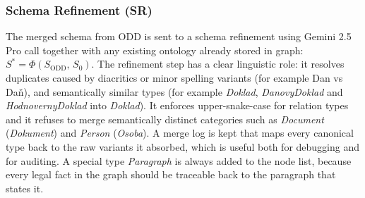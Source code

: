\documentclass[conference]{IEEEtran}
\begin{document}
\subsubsection{Schema Refinement (SR)}
The merged schema from ODD is sent to a schema refinement using Gemini 2.5 Pro call together with any existing ontology already stored in graph: $S^{\ast}=\Phi(S_{\text{ODD}},\,S_0)$. The refinement step has a clear linguistic role: it resolves duplicates caused by diacritics or minor spelling variants (for example Dan vs Daň), and semantically similar types (for example \textit{Doklad}, \textit{DanovyDoklad} and \textit{HodnovernyDoklad} into \textit{Doklad}). It enforces upper-snake-case for relation types and it refuses to merge semantically distinct categories such as \textit{Document} (\textit{Dokument}) and \textit{Person} (\textit{Osoba}). A merge log is kept that maps every canonical type back to the raw variants it absorbed, which is useful both for debugging and for auditing. A special type \textit{Paragraph} is always added to the node list, because every legal fact in the graph should be traceable back to the paragraph that states it.
\end{document}
